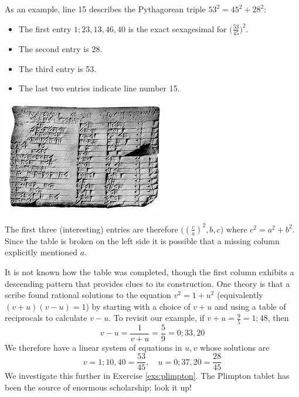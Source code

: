 \begin{minipage}[t]{0.5\linewidth}\vspace{0pt}
	As an example, line 15 describes the Pythagorean triple $53^2=45^2+28^2$:
\begin{itemize}
  \item The first entry $1;23,13,46,40$ is the exact sexagesimal for $\bigl(\frac{53}{45}\bigr)^2$.
  \item The second entry is 28.
  \item The third entry is 53.
  \item The last two entries indicate line number 15.
\end{itemize}
\end{minipage}
\hfill
\begin{minipage}[t]{0.49\linewidth}\vspace{-15pt}
	\flushright\includegraphics[scale=0.85]{plimpton322.jpg}
\end{minipage}

The first three (interesting) entries are therefore $\bigl((\frac ca)^2,b,c\bigr)$ where $c^2=a^2+b^2$. Since the table is broken on the left side it is possible that a missing column explicitly mentioned $a$.
\smallbreak 

It is not known how the table was completed, though the first column exhibits a descending pattern that provides clues to its construction. One theory is that a scribe found rational solutions to the equation $v^2=1+u^2$ (equivalently $(v+u)(v-u)=1$) by starting with a choice of $v+u$ and using a table of reciprocals to calculate $v-u$.
\smallbreak
To revisit our example, if $v+u=\frac 95=1;48$, then
\[
	v-u=\frac 1{v+u}=\frac 59=0;33,20
\]
We therefore have a linear system of equations in $u,v$ whose solutions are
\[
	v=1;10,40=\frac{53}{45},\quad u=0;37,20=\frac{28}{45}
\]
We investigate this further in Exercise \ref{exs:plimpton}. The Plimpton tablet has been the source of enormous scholarship; look it up!



